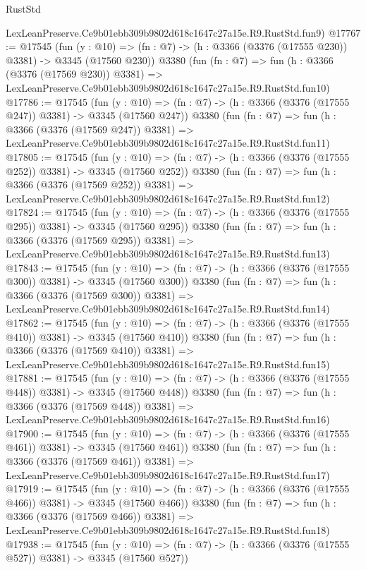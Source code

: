 \begin{lexlean}{RustStd}
\begin{coremodule}
    LexLeanPreserve.Ce9b01ebb309b9802d618c1647c27a15e.R9.RustStd.fun9)
@17767 := @17545
    (fun (y : @10) => (fn : @7) -> (h : @3366 (@3376 (@17555 @230)) @3381) -> @3345 (@17560 @230))
    @3380
    (fun (fn : @7) =>
    fun (h : @3366 (@3376 (@17569 @230)) @3381) =>
    LexLeanPreserve.Ce9b01ebb309b9802d618c1647c27a15e.R9.RustStd.fun10)
@17786 := @17545
    (fun (y : @10) => (fn : @7) -> (h : @3366 (@3376 (@17555 @247)) @3381) -> @3345 (@17560 @247))
    @3380
    (fun (fn : @7) =>
    fun (h : @3366 (@3376 (@17569 @247)) @3381) =>
    LexLeanPreserve.Ce9b01ebb309b9802d618c1647c27a15e.R9.RustStd.fun11)
@17805 := @17545
    (fun (y : @10) => (fn : @7) -> (h : @3366 (@3376 (@17555 @252)) @3381) -> @3345 (@17560 @252))
    @3380
    (fun (fn : @7) =>
    fun (h : @3366 (@3376 (@17569 @252)) @3381) =>
    LexLeanPreserve.Ce9b01ebb309b9802d618c1647c27a15e.R9.RustStd.fun12)
@17824 := @17545
    (fun (y : @10) => (fn : @7) -> (h : @3366 (@3376 (@17555 @295)) @3381) -> @3345 (@17560 @295))
    @3380
    (fun (fn : @7) =>
    fun (h : @3366 (@3376 (@17569 @295)) @3381) =>
    LexLeanPreserve.Ce9b01ebb309b9802d618c1647c27a15e.R9.RustStd.fun13)
@17843 := @17545
    (fun (y : @10) => (fn : @7) -> (h : @3366 (@3376 (@17555 @300)) @3381) -> @3345 (@17560 @300))
    @3380
    (fun (fn : @7) =>
    fun (h : @3366 (@3376 (@17569 @300)) @3381) =>
    LexLeanPreserve.Ce9b01ebb309b9802d618c1647c27a15e.R9.RustStd.fun14)
@17862 := @17545
    (fun (y : @10) => (fn : @7) -> (h : @3366 (@3376 (@17555 @410)) @3381) -> @3345 (@17560 @410))
    @3380
    (fun (fn : @7) =>
    fun (h : @3366 (@3376 (@17569 @410)) @3381) =>
    LexLeanPreserve.Ce9b01ebb309b9802d618c1647c27a15e.R9.RustStd.fun15)
@17881 := @17545
    (fun (y : @10) => (fn : @7) -> (h : @3366 (@3376 (@17555 @448)) @3381) -> @3345 (@17560 @448))
    @3380
    (fun (fn : @7) =>
    fun (h : @3366 (@3376 (@17569 @448)) @3381) =>
    LexLeanPreserve.Ce9b01ebb309b9802d618c1647c27a15e.R9.RustStd.fun16)
@17900 := @17545
    (fun (y : @10) => (fn : @7) -> (h : @3366 (@3376 (@17555 @461)) @3381) -> @3345 (@17560 @461))
    @3380
    (fun (fn : @7) =>
    fun (h : @3366 (@3376 (@17569 @461)) @3381) =>
    LexLeanPreserve.Ce9b01ebb309b9802d618c1647c27a15e.R9.RustStd.fun17)
@17919 := @17545
    (fun (y : @10) => (fn : @7) -> (h : @3366 (@3376 (@17555 @466)) @3381) -> @3345 (@17560 @466))
    @3380
    (fun (fn : @7) =>
    fun (h : @3366 (@3376 (@17569 @466)) @3381) =>
    LexLeanPreserve.Ce9b01ebb309b9802d618c1647c27a15e.R9.RustStd.fun18)
@17938 := @17545
    (fun (y : @10) => (fn : @7) -> (h : @3366 (@3376 (@17555 @527)) @3381) -> @3345 (@17560 @527))

\end{coremodule}
\end{lexlean}
